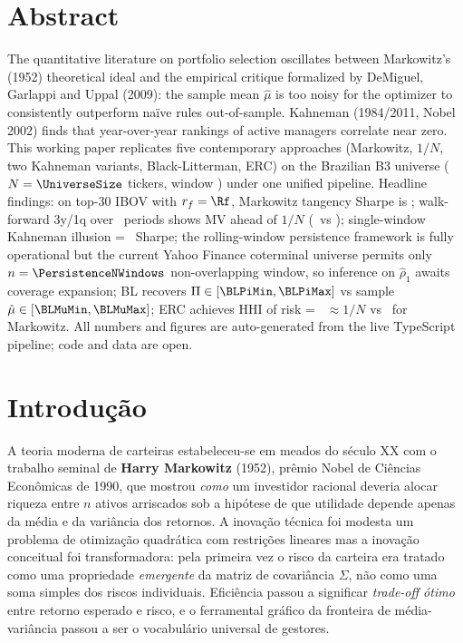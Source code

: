 \documentclass[12pt,a4paper,oneside]{article}
\begin{document}
\section*{Abstract}
\begin{singlespace}\small\noindent
The quantitative literature on portfolio selection oscillates between
Markowitz's (1952) theoretical ideal and the empirical critique
formalized by DeMiguel, Garlappi and Uppal (2009): the sample mean
$\hat{\mu}$ is too noisy for the optimizer to consistently outperform
naïve rules out-of-sample. Kahneman (1984/2011, Nobel 2002) finds
that year-over-year rankings of active managers correlate near zero.
This working paper replicates five contemporary approaches
(Markowitz, $1/N$, two Kahneman variants, Black-Litterman, ERC) on
the Brazilian B3 universe ($N = \UniverseSize$ tickers, window
\UniverseDates) under one unified pipeline. Headline findings: on
top-30 IBOV with $r_f = \Rf$, Markowitz tangency Sharpe is
\MVTangencySharpe; walk-forward 3y/1q over \IngenuoPeriods\ periods
shows MV ahead of $1/N$ (\IngenuoMVSharpe\ vs \IngenuoEQSharpe); single-window
Kahneman illusion = \KhIllusion\ Sharpe; the rolling-window
persistence framework is fully operational but the current Yahoo
Finance coterminal universe permits only $n = \PersistenceNWindows$
non-overlapping window, so inference on $\hat{\rho}_1$ awaits coverage
expansion; BL recovers $\Pi \in [\BLPiMin, \BLPiMax]$ vs sample $\hat{\mu}
\in [\BLMuMin, \BLMuMax]$; ERC achieves HHI of risk = \PaERCHHI\
$\approx 1/N$ vs \PaMarkowitzHHI\ for Markowitz. All numbers and
figures are auto-generated from the live TypeScript pipeline; code
and data are open.
\end{singlespace}

\newpage

\tableofcontents
\newpage

\section{Introdução}\label{sec:intro}

A teoria moderna de carteiras estabeleceu-se em meados do século XX
com o trabalho seminal de \textbf{Harry Markowitz} (1952), prêmio
Nobel de Ciências Econômicas de 1990, que mostrou \textit{como} um
investidor racional deveria alocar riqueza entre $n$ ativos arriscados
sob a hipótese de que utilidade depende apenas da média e da
variância dos retornos. A inovação técnica foi modesta \textemdash{}
um problema de otimização quadrática com restrições lineares
\textemdash{} mas a inovação conceitual foi transformadora: pela
primeira vez o risco da carteira era tratado como uma propriedade
\textit{emergente} da matriz de covariância $\Sigma$, não como uma
soma simples dos riscos individuais. Eficiência passou a significar
\textit{trade-off ótimo} entre retorno esperado e risco, e o
ferramental gráfico da fronteira de média-variância passou a ser o
vocabulário universal de gestores.
\end{document}
